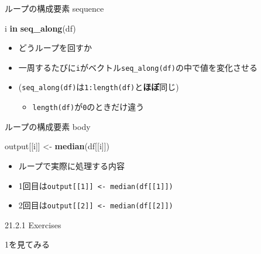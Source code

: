 \documentclass[ignorenonframetext,]{beamer}
\newenvironment{Shaded}{\begin{snugshade}}{\end{snugshade}}
\newcommand{\KeywordTok}[1]{\textcolor[rgb]{0.13,0.29,0.53}{\textbf{#1}}}
\newcommand{\StringTok}[1]{\textcolor[rgb]{0.31,0.60,0.02}{#1}}
\newcommand{\ControlFlowTok}[1]{\textcolor[rgb]{0.13,0.29,0.53}{\textbf{#1}}}
\newcommand{\NormalTok}[1]{#1}
\providecommand{\tightlist}{%
  \setlength{\itemsep}{0pt}\setlength{\parskip}{0pt}}
\begin{document}
\begin{frame}[fragile]{ループの構成要素 sequence}

\begin{Shaded}
\begin{Highlighting}[]
\NormalTok{i }\ControlFlowTok{in} \KeywordTok{seq_along}\NormalTok{(df)}
\end{Highlighting}
\end{Shaded}

\begin{itemize}
\tightlist
\item
  どうループを回すか
\item
  一周するたびに\texttt{i}がベクトル\texttt{seq\_along(df)}の中で値を変化させる
\item
  (\texttt{seq\_along(df)}は\texttt{1:length(df)}と\textbf{ほぼ}同じ)

  \begin{itemize}
  \tightlist
  \item
    \texttt{length(df)}が\texttt{0}のときだけ違う
  \end{itemize}
\end{itemize}

\end{frame}

\begin{frame}[fragile]{ループの構成要素 body}

\begin{Shaded}
\begin{Highlighting}[]
\NormalTok{output[[i]] <-}\StringTok{ }\KeywordTok{median}\NormalTok{(df[[i]])}
\end{Highlighting}
\end{Shaded}

\begin{itemize}
\tightlist
\item
  ループで実際に処理する内容
\item
  1回目は\texttt{output{[}{[}1{]}{]}\ \textless{}-\ median(df{[}{[}1{]}{]})}
\item
  2回目は\texttt{output{[}{[}2{]}{]}\ \textless{}-\ median(df{[}{[}2{]}{]})}
\end{itemize}

\end{frame}

\begin{frame}{21.2.1 Exercises}

1を見てみる

\end{frame}
\end{document}
